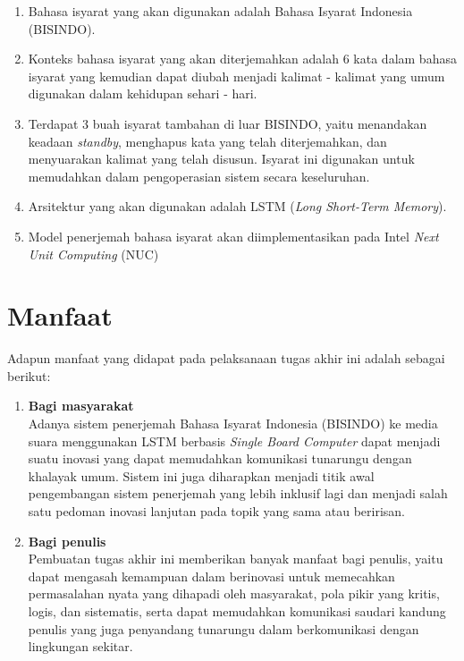 \begin{enumerate}[nolistsep]

  \item Bahasa isyarat yang akan digunakan adalah Bahasa Isyarat Indonesia (BISINDO).

  \item Konteks bahasa isyarat yang akan diterjemahkan adalah 6 kata dalam bahasa isyarat yang kemudian dapat diubah menjadi kalimat - kalimat yang umum digunakan dalam kehidupan sehari - hari.

  \item Terdapat 3 buah isyarat tambahan di luar BISINDO, yaitu menandakan keadaan \emph{standby}, menghapus kata yang telah diterjemahkan, dan menyuarakan kalimat yang telah disusun. Isyarat ini digunakan untuk memudahkan dalam pengoperasian sistem secara keseluruhan.

  \item Arsitektur yang akan digunakan adalah LSTM (\emph{Long Short-Term Memory}).
  
  \item Model penerjemah bahasa isyarat akan diimplementasikan pada Intel \emph{Next Unit Computing} (NUC)
\end{enumerate}

\section{Manfaat}
\label{sec:manfaatpenulisan}

Adapun manfaat yang didapat pada pelaksanaan tugas akhir ini adalah sebagai berikut:

\begin{enumerate}[nolistsep]

  \item \textbf{Bagi masyarakat} \\     
  Adanya sistem penerjemah Bahasa Isyarat Indonesia (BISINDO) ke media suara menggunakan LSTM berbasis \emph{Single Board Computer} dapat menjadi suatu inovasi yang dapat memudahkan komunikasi tunarungu dengan khalayak umum. Sistem ini juga diharapkan menjadi titik awal pengembangan sistem penerjemah yang lebih inklusif lagi dan menjadi salah satu pedoman inovasi lanjutan pada topik yang sama atau beririsan.
        \vspace{2ex}

  \item \textbf{Bagi penulis} \\
  Pembuatan tugas akhir ini memberikan banyak manfaat bagi penulis, yaitu dapat mengasah kemampuan dalam berinovasi untuk memecahkan permasalahan nyata yang dihapadi oleh masyarakat, pola pikir yang kritis, logis, dan sistematis, serta dapat memudahkan komunikasi saudari kandung penulis yang juga penyandang tunarungu dalam berkomunikasi dengan lingkungan sekitar.

\end{enumerate}


